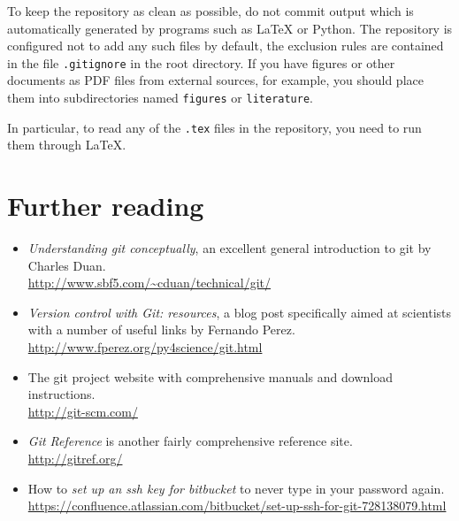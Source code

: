 \documentclass[twocolumn,secnumarabic,rmp]{revtex4}
\begin{document}
To keep the repository as clean as possible, do not commit output
which is automatically generated by programs such as {\LaTeX} or
\textsf{Python}.  The repository is configured not to add any such
files by default, the exclusion rules are contained in the file
\verb+.gitignore+ in the root directory.  If you have figures or other
documents as PDF files from external sources, for example, you should
place them into subdirectories named \verb+figures+ or
\verb+literature+.  

In particular, to read any of the \verb+.tex+ files in the repository,
you need to run them through \LaTeX.

\section{Further reading}


\begin{itemize}
\item \emph{Understanding git conceptually}, an excellent
general introduction to \textsf{git} by Charles Duan.\\
\url{http://www.sbf5.com/~cduan/technical/git/}

\item \emph{Version control with Git: resources}, a blog post
specifically aimed at scientists with a number of useful links by
Fernando Perez. \\
\url{http://www.fperez.org/py4science/git.html}

\item The \textsf{git} project website with comprehensive manuals and
download instructions.\\
\url{http://git-scm.com/}

\item \emph{Git Reference} is another fairly comprehensive reference
site. \\
\url{http://gitref.org/}

\item How to \emph{set up an ssh key for bitbucket} to never type in
your password again. \\
\url{https://confluence.atlassian.com/bitbucket/set-up-ssh-for-git-728138079.html}

\end{itemize}
\end{document}
